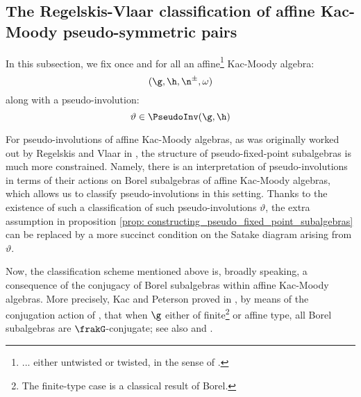     \subsection{The Regelskis-Vlaar classification of affine Kac-Moody pseudo-symmetric pairs} \label{subsection: affine_kac_moody_pseudo_symmetric_pairs}
        In this subsection, we fix once and for all an affine\footnote{... either untwisted or twisted, in the sense of \cite[Chapter 8]{kac_infinite_dimensional_lie_algebras}.} Kac-Moody algebra:
            $$(\g, \h, \n^{\pm}, \omega)$$
        along with a pseudo-involution:
            $$\vartheta \in \PseudoInv(\g, \h)$$
    
        For pseudo-involutions of affine Kac-Moody algebras, as was originally worked out by Regelskis and Vlaar in \cite{regelskis_vlaar_kac_moody_pseudo_symmetric_pairs}, the structure of pseudo-fixed-point subalgebras is much more constrained. Namely, there is an interpretation of pseudo-involutions in terms of their actions on Borel subalgebras of affine Kac-Moody algebras, which allows us to classify pseudo-involutions in this setting. Thanks to the existence of such a classification of such pseudo-involutions $\vartheta$, the extra assumption in proposition \ref{prop: constructing_pseudo_fixed_point_subalgebras} can be replaced by a more succinct condition on the Satake diagram arising from $\vartheta$.

        Now, the classification scheme mentioned above is, broadly speaking, a consequence of the conjugacy of Borel subalgebras within affine Kac-Moody algebras. More precisely, Kac and Peterson proved in \cite{kac_peterson_infinite_flag_varieties_and_conjugacy_of_cartan_subalgebras}, by means of the conjugation action of , that when $\g$ either of finite\footnote{The finite-type case is a classical result of Borel.} or affine type, all Borel subalgebras are $\frakG$-conjugate; see also \cite{chernousov_egorov_gille_pianzola_cohomological_proof_of_peterson_kac_theorem} and \cite{chernousov_neher_pianzola_conjugacy_of_cartan_subalgebras_in_EALAs_with_non_fgc_centreless_cores}. 
    
